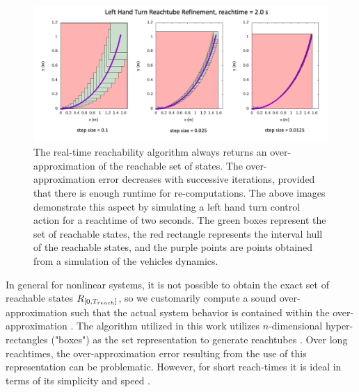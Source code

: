 \documentclass[manuscript,screen,review]{acmart}
\newcommand{\diego}[1]{\textcolor{purple}{\textbf{\underline{DM:}} #1}}
\begin{document}
\begin{figure}[htbp]%
  \centering
  \includegraphics[width=0.90\linewidth]{figures/refinement_cropped.pdf}
  \caption{The real-time reachability algorithm always returns an over-approximation of the reachable set of states. The over-approximation error decreases with successive iterations, provided that there is enough runtime for re-computations. The above images demonstrate this aspect by simulating a left hand turn control action for a reachtime of two seconds. The green boxes represent the set of reachable states, the red rectangle represents the interval hull of the reachable states, and the purple points are points obtained from a simulation of the vehicles dynamics.}
  \label{fig:reach_refine}
\end{figure}%
In general for nonlinear systems, it is not possible to obtain the exact set of reachable states $\mathnormal{R}_{[0,T_{reach}]}$, so we customarily compute a sound over-approximation such that the actual system behavior is contained within the over-approximation \cite{AlthoffNonlinear,Lin2020,Asarin2003}. The algorithm utilized in this work utilizes $n$-dimensional hyper-rectangles ("boxes") as the set representation to generate reachtubes \cite{Johnson2016}. Over long reachtimes, the over-approximation error resulting from the use of this representation can be problematic. However, for short reach-times it is ideal in terms of its simplicity and speed \cite{Bak2014}. 
\end{document}
